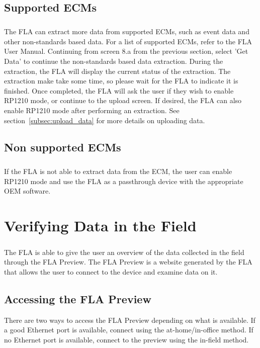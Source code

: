 \documentclass[11pt, oneside]{book}
\begin{document}
\section{Supported ECMs}
\paragraph{  }
The FLA can extract more data from supported ECMs, such as event data and other non-standards based data. For a list of supported ECMs, refer to the FLA User Manual. Continuing from screen 8.a from the previous section, select 'Get Data' to continue the non-standards based data extraction. During the extraction, the FLA will display the current status of the extraction. The extraction make take some time, so please wait for the FLA to indicate it is finished. Once completed, the FLA will ask the user if they wish to enable RP1210 mode, or continue to the upload screen. If desired, the FLA can also enable RP1210 mode after performing an extraction. See section~\ref{subsec:upload_data} for more details on uploading data.

\section{Non supported ECMs}
\paragraph{  }
If the FLA is not able to extract data from the ECM, the user can enable RP1210 mode and use the FLA as a passthrough device with the appropriate OEM software.

\chapter{Verifying Data in the Field}
\paragraph{  }
The FLA is able to give the user an overview of the data collected in the field through the FLA Preview. The FLA Preview is a website generated by the FLA that allows the user to connect to the device and examine data on it.
\section{Accessing the FLA Preview}
There are two ways to access the FLA Preview depending on what is available. If a good Ethernet port is available, connect using the at-home/in-office method. If no Ethernet port is available, connect to the preview using the in-field method.
\end{document}
